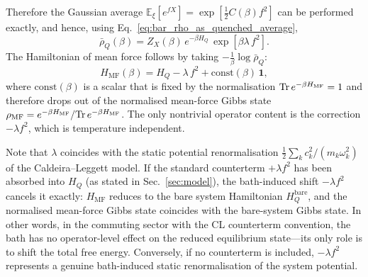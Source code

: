 Therefore the Gaussian average $\mathbb E_\xi[e^{f X}] = \exp[\frac{1}{2}C(\beta)f^2]$ can be performed exactly, and hence, using Eq.~\eqref{eq:bar_rho_as_quenched_average},
\begin{equation}
    \bar\rho_Q(\beta) = Z_X(\beta)\,e^{-\beta H_Q}\,\exp\!\left[\beta\lambda\,f^2\right].
    \label{eq:bar_rho_commuting_closed}
\end{equation}
The Hamiltonian of mean force follows by taking
$-\frac{1}{\beta}\log\bar\rho_Q$:
\begin{equation}
    H_{\mathrm{MF}}(\beta) = H_Q -\lambda\,f^2 +\mathrm{const}(\beta)\,\mathbf 1,
    \label{eq:HMF_commuting_final}
\end{equation}
where $\mathrm{const}(\beta)$ is a scalar that is fixed by the normalisation
$\mathrm{Tr}\,e^{-\beta H_{\mathrm{MF}}}=1$ and therefore drops out of the
normalised mean-force Gibbs state
$\rho_{\mathrm{MF}}=e^{-\beta H_{\mathrm{MF}}}/\mathrm{Tr}\,e^{-\beta H_{\mathrm{MF}}}$.
The only nontrivial operator content is the correction $-\lambda f^2$, which
is temperature independent.

Note that $\lambda$ coincides with the static potential renormalisation
$\frac{1}{2}\sum_k c_k^2/(m_k\omega_k^2)$ of the Caldeira--Leggett
model. If the standard counterterm $+\lambda f^2$ has been absorbed into
$H_Q$ (as stated in Sec.~\ref{sec:model}), the bath-induced shift
$-\lambda f^2$ cancels it exactly:
$H_{\mathrm{MF}}$ reduces to the bare system Hamiltonian $H_Q^{\mathrm{bare}}$,
and the normalised mean-force Gibbs state coincides with the bare-system
Gibbs state. In other words, in the commuting sector with the CL counterterm
convention, the bath has no operator-level effect on the reduced equilibrium
state---its only role is to shift the total free energy.
Conversely, if no counterterm is included, $-\lambda f^2$ represents a genuine
bath-induced static renormalisation of the system potential.
